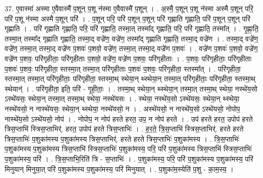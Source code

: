 \documentclass[17pt]{extarticle}
\begin{document}
37. ए॒वास्मा॑ अस्मा ए॒वैवास्मै॑ प॒शून् प॒शू न॑स्मा ए॒वैवास्मै॑ प॒शून् । . अ॒स्मै॒ प॒शून् प॒शू न॑स्मा अस्मै प॒शून् परि॒ परि॑ प॒शू न॑स्मा अस्मै प॒शून् परि॑ । . प॒शून् परि॒ परि॑ प॒शून् प॒शून् परि॑ गृह्णाति गृह्णाति॒ परि॑ प॒शून् प॒शून् परि॑ गृह्णाति । . परि॑ गृह्णाति गृह्णाति॒ परि॒ परि॑ गृह्णाति॒ तस्मा॒त् तस्मा᳚द् गृह्णाति॒ परि॒ परि॑ गृह्णाति॒ तस्मा᳚त् । . गृ॒ह्णा॒ति॒ तस्मा॒त् तस्मा᳚द् गृह्णाति गृह्णाति॒ तस्मा॒द् वज्रे॑ण॒ वज्रे॑ण॒ तस्मा᳚द् गृह्णाति गृह्णाति॒ तस्मा॒द् वज्रे॑ण । . तस्मा॒द् वज्रे॑ण॒ वज्रे॑ण॒ तस्मा॒त् तस्मा॒द् वज्रे॑ण प॒शवः॑ प॒शवो॒ वज्रे॑ण॒ तस्मा॒त् तस्मा॒द् वज्रे॑ण प॒शवः॑ । . वज्रे॑ण प॒शवः॑ प॒शवो॒ वज्रे॑ण॒ वज्रे॑ण प॒शवः॒ परि॑गृहीताः॒ परि॑गृहीताः प॒शवो॒ वज्रे॑ण॒ वज्रे॑ण प॒शवः॒ परि॑गृहीताः । . प॒शवः॒ परि॑गृहीताः॒ परि॑गृहीताः प॒शवः॑ प॒शवः॒ परि॑गृहीता॒ स्तस्मा॒त् तस्मा॒त् परि॑गृहीताः प॒शवः॑ प॒शवः॒ परि॑गृहीता॒ स्तस्मा᳚त् । . परि॑गृहीता॒ स्तस्मा॒त् तस्मा॒त् परि॑गृहीताः॒ परि॑गृहीता॒ स्तस्मा॒थ् स्थेया॒न् थ्स्थेया॒न् तस्मा॒त् परि॑गृहीताः॒ परि॑गृहीता॒ स्तस्मा॒थ् स्थेयान्॑ । . परि॑गृहीता॒ इति॒ परि॑ - गृ॒ही॒ताः॒ । . तस्मा॒थ् स्थेया॒न् थ्स्थेया॒न् तस्मा॒त् तस्मा॒थ् स्थेया॒ नस्थे॑य॒सो ऽस्थे॑यसः॒ स्थेया॒न् तस्मा॒त् तस्मा॒थ् स्थेया॒ नस्थे॑यसः । . स्थेया॒ नस्थे॑य॒सो ऽस्थे॑यसः॒ स्थेया॒न् थ्स्थेया॒ नस्थे॑यसो॒ न नास्थे॑यसः॒ स्थेया॒न् थ्स्थेया॒ नस्थे॑यसो॒ न । . अस्थे॑यसो॒ न नास्थे॑य॒सो ऽस्थे॑यसो॒ नोपोप॒ नास्थे॑य॒सो ऽस्थे॑यसो॒ नोप॑ । . नोपोप॒ न नोप॑ हरते हरत॒ उप॒ न नोप॑ हरते । . उप॑ हरते हरत॒ उपोप॑ हरते त्रिस॒प्ताभि॑ स्त्रिस॒प्ताभिर्॑. हरत॒ उपोप॑ हरते त्रिस॒प्ताभिः॑ । . ह॒र॒ते॒ त्रि॒स॒प्ताभि॑ स्त्रिस॒प्ताभिर्॑. हरते हरते त्रिस॒प्ताभिः॑ प॒शुका॑मस्य प॒शुका॑मस्य त्रिस॒प्ताभिर्॑. हरते हरते त्रिस॒प्ताभिः॑ प॒शुका॑मस्य । . त्रि॒स॒प्ताभिः॑ प॒शुका॑मस्य प॒शुका॑मस्य त्रिस॒प्ताभि॑ स्त्रिस॒प्ताभिः॑ प॒शुका॑मस्य॒ परि॒ परि॑ प॒शुका॑मस्य त्रिस॒प्ताभि॑ स्त्रिस॒प्ताभिः॑ प॒शुका॑मस्य॒ परि॑ । . त्रि॒स॒प्ताभि॒रिति॑ त्रि - स॒प्ताभिः॑ । . प॒शुका॑मस्य॒ परि॒ परि॑ प॒शुका॑मस्य प॒शुका॑मस्य॒ परि॑ मिनुयान् मिनुया॒त् परि॑ प॒शुका॑मस्य प॒शुका॑मस्य॒ परि॑ मिनुयात् । . प॒शुका॑म॒स्येति॑ प॒शु - का॒म॒स्य॒ । \newline
\pagebreak
{}
\end{document}
